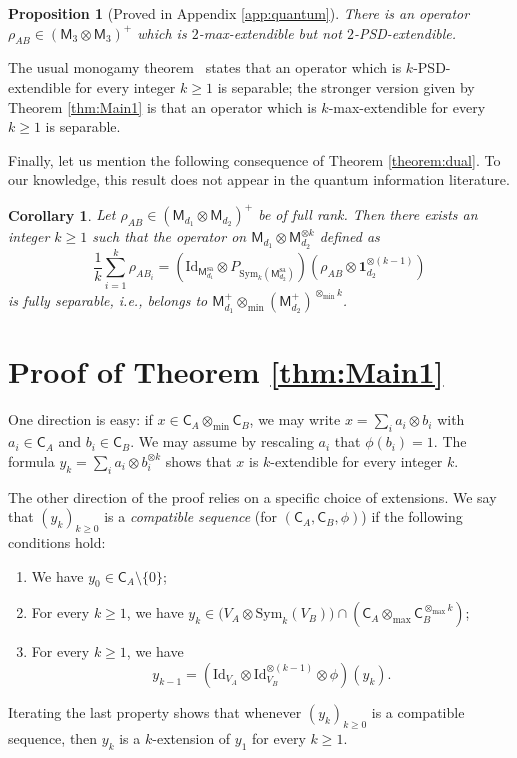 \documentclass{amsart}
\renewcommand{\geq}{\geqslant}
\newcommand{\gC}{\mathsf{C}}
\newcommand{\M}{\mathsf{M}}
\newcommand{\Id}{\mathrm{Id}}
\def\lb{\left(}
\def\rb{\right)}
\newcommand{\Sym}{\mathrm{Sym}}
\theoremstyle{plain}
\newtheorem{corollary}[theorem]{Corollary}
\newtheorem{proposition}[theorem]{Proposition}
\newcommand{\tmin}{{\otimes_{\min}}}
\newcommand{\tmax}{{\otimes_{\max}}}
\begin{document}
\begin{proposition}[Proved in Appendix \ref{app:quantum}] \label{prop:quantum}
There is an operator $\rho_{AB} \in (\M_3 \otimes \M_3)^+$ which is $2$-max-extendible but not $2$-PSD-extendible. 
\end{proposition}

The usual monogamy theorem~\cite{DPS04, Yang06} states that an operator which is $k$-PSD-extendible for every integer $k \geq 1$ is separable; the stronger version given by Theorem \ref{thm:Main1} is that an operator which is $k$-max-extendible for every $k \geq 1$ is separable. 

Finally, let us mention the following consequence of Theorem \ref{theorem:dual}. To our knowledge, this result does not appear in the quantum information literature.

\begin{corollary}
Let $\rho_{AB}\in (\M_{d_1} \otimes \M_{d_2})^+$ be of full rank. Then there exists an integer $k \geq 1$ such that the operator on $\M_{d_1} \otimes \M_{d_2}^{\otimes k}$ defined as
\[ \frac{1}{k} \sum_{i=1}^k \rho_{AB_i} = \left( \Id_{\displaystyle \M_{d_1}^{\mathrm{sa}}} \otimes P_{\Sym_k(\M_{d_2}^{\mathrm{sa}})} \right) \left(\rho_{AB} \otimes \mathbf{1}^{\otimes (k-1)}_{d_2} \right)\]
is fully separable, i.e., belongs to $\M_{d_1}^+ \tmin \left( \M_{d_2}^+\right)^{\tmin k}$. 
\end{corollary}


\section{Proof of Theorem \ref{thm:Main1}} \label{sec:proof-convergence}

One direction is easy: if $x \in \gC_A \tmin \gC_B$, we may write $x = \sum_{i} a_i \otimes b_i$ with $a_i \in \gC_A$ and $b_i \in \gC_B$. We may assume by rescaling $a_i$ that 
$\phi(b_i)=1$. The formula $y_k = \sum_i a_i \otimes b_i^{\otimes k}$ shows that $x$ is $k$-extendible for every integer $k$.

The other direction of the proof relies on a specific choice of extensions. We say that $(y_k)_{k \geq 0}$ is a \emph{compatible sequence} (for $(\gC_A,\gC_B,\phi)$) if the following conditions hold:
\begin{enumerate}
\item[(i)] We have $y_0 \in \gC_A \setminus \{0\}$;
\item[(ii)] For every $k \geq 1$, we have $y_k \in \Big( V_A \otimes \Sym_k(V_B) \Big) \cap \lb \gC_A \tmax \gC_B^{\tmax k} \rb$;
\item[(iii)] For every $k \geq 1$, we have 
\[y_{k-1} = \left( \Id_{V_A} \otimes \Id_{V_B}^{\otimes (k-1)} \otimes \phi \right)(y_k). \]
\end{enumerate}
Iterating the last property shows that whenever $(y_k)_{k \geq 0}$ is a compatible sequence, then $y_k$ is a $k$-extension of $y_1$ for every $k \geq 1$.
\end{document}
